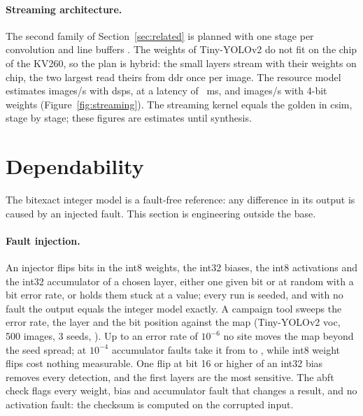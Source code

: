 \documentclass[11pt,a4paper]{article}
\begin{document}
\begin{table}[htbp]
\caption{Formats on the same model, \gls{voc}2007 test (,
\texttt{quant\_4bits.md}, \texttt{postproc\_hw.md}).}
\label{tab:formats}
\small{}
\end{table}


\paragraph{Streaming architecture.} The second family of Section~\ref{sec:related}
\cite[\#004.0]{2018-venieris} is planned with one stage per convolution and line buffers
\cite[\#011.0]{2023-montgomerie-corcoran}. The weights of Tiny-YOLOv2 do not fit on the
chip of the KV260, so the plan is hybrid: the small layers stream with their weights on
chip, the two largest read theirs from \gls{ddr} once per image. The resource model estimates
 images/s with  \glspl{dsp}, at a latency of
~ms, and  images/s with 4-bit weights
(Figure~\ref{fig:streaming}). The streaming kernel equals the \gls{golden} in \gls{csim}, stage
by stage; these figures are estimates until synthesis.


\section{Dependability}\label{sec:dependability}

The \gls{bitexact} integer model is a fault-free reference: any difference in its output is caused
by an injected fault. This section is engineering outside the \gls{base}.

\paragraph{Fault injection.} An injector flips bits in the \gls{int8} weights, the int32 biases, the
\gls{int8} activations and the int32 accumulator of a chosen layer, either one given bit or at random
with a bit error rate, or holds them stuck at a value; every run is seeded, and with no fault the
output equals the integer model exactly. A campaign tool sweeps the error rate, the layer and the
bit position against the \gls{map} (Tiny-YOLOv2 \gls{voc}, 500 images, 3 seeds,
). Up to an error rate of $10^{-6}$ no site moves the \gls{map} beyond the
seed spread; at $10^{-4}$ accumulator faults take it from  to , while \gls{int8} weight
flips cost nothing measurable. One flip at bit 16 or higher of an int32 bias removes every
detection, and the first layers are the most sensitive. The \gls{abft} check flags every weight,
bias and accumulator fault that changes a result, and no activation fault: the checksum is
computed on the corrupted input.
\end{document}
